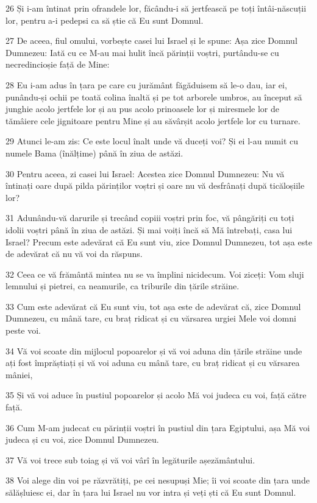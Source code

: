\par 26 Și i-am întinat prin ofrandele lor, făcându-i să jertfească pe toți întâi-născuții lor, pentru a-i pedepsi ca să știe că Eu sunt Domnul.
\par 27 De aceea, fiul omului, vorbește casei lui Israel și le spune: Așa zice Domnul Dumnezeu: Iată cu ce M-au mai hulit încă părinții voștri, purtându-se cu necredincioșie față de Mine:
\par 28 Eu i-am adus în țara pe care cu jurământ făgăduisem să le-o dau, iar ei, punându-și ochii pe toată colina înaltă și pe tot arborele umbros, au început să junghie acolo jertfele lor și au pus acolo prinoasele lor și miresmele lor de tămâiere cele jignitoare pentru Mine și au săvârșit acolo jertfele lor cu turnare.
\par 29 Atunci le-am zis: Ce este locul înalt unde vă duceți voi? Și ei l-au numit cu numele Bama (înălțime) până în ziua de astăzi.
\par 30 Pentru aceea, zi casei lui Israel: Acestea zice Domnul Dumnezeu: Nu vă întinați oare după pilda părinților voștri și oare nu vă desfrânați după ticăloșiile lor?
\par 31 Adunându-vă darurile și trecând copiii voștri prin foc, vă pângăriți cu toți idolii voștri până în ziua de astăzi. Și mai voiți încă să Mă întrebați, casa lui Israel? Precum este adevărat că Eu sunt viu, zice Domnul Dumnezeu, tot așa este de adevărat că nu vă voi da răspuns.
\par 32 Ceea ce vă frământă mintea nu se va împlini nicidecum. Voi ziceți: Vom sluji lemnului și pietrei, ca neamurile, ca triburile din țările străine.
\par 33 Cum este adevărat că Eu sunt viu, tot așa este de adevărat că, zice Domnul Dumnezeu, cu mână tare, cu braț ridicat și cu vărsarea urgiei Mele voi domni peste voi.
\par 34 Vă voi scoate din mijlocul popoarelor și vă voi aduna din țările străine unde ați fost împrăștiați și vă voi aduna cu mână tare, cu braț ridicat și cu vărsarea mâniei,
\par 35 Și vă voi aduce în pustiul popoarelor și acolo Mă voi judeca cu voi, față către față.
\par 36 Cum M-am judecat cu părinții voștri în pustiul din țara Egiptului, așa Mă voi judeca și cu voi, zice Domnul Dumnezeu.
\par 37 Vă voi trece sub toiag și vă voi vârî în legăturile așezământului.
\par 38 Voi alege din voi pe răzvrătiți, pe cei nesupuși Mie; îi voi scoate din țara unde sălășluiesc ei, dar în țara lui Israel nu vor intra și veți ști că Eu sunt Domnul.
